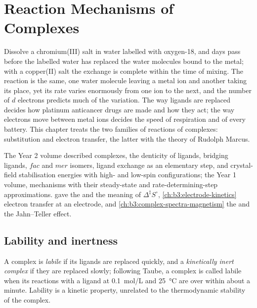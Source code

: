 \chapter{Reaction Mechanisms of Complexes}\label{ch:b3:complex-mechanisms}

Dissolve a chromium(III) salt in water labelled with oxygen-18, and days pass
before the labelled water has replaced the water molecules bound to the
metal; with a copper(II) salt the exchange is complete within the time of
mixing. The reaction is the same, one water molecule leaving a metal ion and
another taking its place, yet its rate varies enormously from one ion to the
next, and the number of $d$ electrons predicts much of the variation. The way
ligands are replaced decides how platinum anticancer drugs are made and how
they act; the way electrons move between metal ions decides the speed of
respiration and of every battery. This chapter treats the two families of
reactions of complexes: substitution and electron transfer, the latter with
the theory of Rudolph Marcus.

\begin{recall}
The Year 2 volume described complexes, the denticity of ligands, bridging
ligands, $fac$ and $mer$ isomers, ligand exchange as an elementary step, and
crystal-field stabilisation energies with high- and low-spin configurations;
the Year 1 volume, mechanisms with their steady-state and rate-determining-step
approximations.  gave the  and the
meaning of $\Delta^{\ddagger}S^\circ$, \cref{ch:b3:electrode-kinetics} electron transfer at an
electrode, and \cref{ch:b3:complex-spectra-magnetism} the  and the
Jahn--Teller effect.
\end{recall}

\section{Lability and inertness}

\begin{definition}\label{def:b3:complex-mechanisms:labile}
A complex is \emph{labile} if its ligands are replaced
quickly, and a \emph{kinetically inert complex}
if they are replaced slowly; following Taube, a complex is called labile when
its reactions with a ligand at \qty{0.1}{mol/L} and \qty{25}{\celsius} are over within about a
minute. Lability is a kinetic property, unrelated to the thermodynamic stability
of the complex.
\end{definition}

